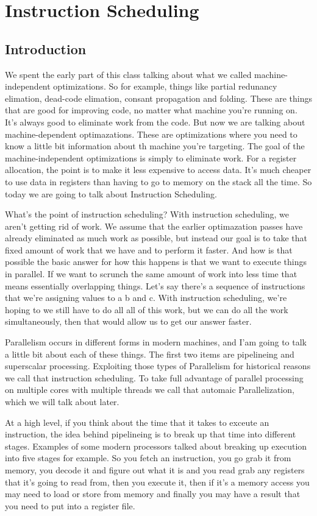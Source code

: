 \section{Instruction Scheduling}
\subsection{Introduction}
We spent the early part of this class talking about what we called
machine-independent optimizations. So for example, things like
partial redunancy elimation, dead-code elimation, consant propagation and 
folding. These are things that are good for improving code, no matter
what machine you're running on. It's always good to eliminate work
from the code. But now we are talking about machine-dependent optimazations.
These are optimizations where you need to know a little bit information
about th machine you're targeting. The goal of the machine-independent
optimizations is simply to eliminate work. For a register allocation, the point
is to make it less expensive to access data. It's much cheaper to use data in 
registers than having to go to memory on the stack all the time. So today we are going to 
talk about Instruction Scheduling. 

What's the point of instruction scheduling? With instruction scheduling, 
we aren't getting rid of work. We assume that the earlier optimazation passes have 
already eliminated as much work as possible, but instead our goal is to take that 
fixed amount of work that we have and to perform it faster. And how is that possible
the basic answer for how this happens is that we want to execute things in parallel.
If we want to scrunch the same amount of work into less time that means essentially
overlapping things. Let's say there's a sequence of instructions that we're assigning 
values to a b and c. With instruction scheduling, we're hoping to we still have to do all
all of this work, but we can do all the work simultaneously, then that would allow 
us to get our answer faster. 

Parallelism occurs in different forms in modern machines, and I'am going to talk a little
bit about each of these things. The first two items are pipelineing and superscalar 
processing. Exploiting those types of Parallelism for historical reasons we call that 
instruction scheduling. To take full advantage of parallel processing on multiple cores
with multiple threads we call that automaic Parallelization, which we will talk about
later. 

At a high level, if you think about the time that it takes to exceute an instruction,
the idea behind pipelineing is to break up that time into different stages.
Examples of some modern processors talked about breaking up execution into five 
stages for example. So you fetch an instruction, you go grab it from memory, you 
decode it and figure out what it is and you read grab any registers that it's going to read
from, then you execute it, then if it's a memory access you may need to load or store
from memory and finally you may have a result that you need to put into a register file.
